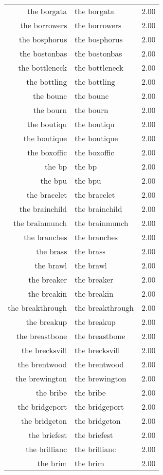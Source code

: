 \begin{table}[ht]
\begin{tabular}{rlr}
  the borgata & the borgata & 2.00 \\ 
  the borrowers & the borrowers & 2.00 \\ 
  the bosphorus & the bosphorus & 2.00 \\ 
  the bostonbas & the bostonbas & 2.00 \\ 
  the bottleneck & the bottleneck & 2.00 \\ 
  the bottling & the bottling & 2.00 \\ 
  the bounc & the bounc & 2.00 \\ 
  the bourn & the bourn & 2.00 \\ 
  the boutiqu & the boutiqu & 2.00 \\ 
  the boutique & the boutique & 2.00 \\ 
  the boxoffic & the boxoffic & 2.00 \\ 
  the bp & the bp & 2.00 \\ 
  the bpu & the bpu & 2.00 \\ 
  the bracelet & the bracelet & 2.00 \\ 
  the brainchild & the brainchild & 2.00 \\ 
  the brainmunch & the brainmunch & 2.00 \\ 
  the branches & the branches & 2.00 \\ 
  the brass & the brass & 2.00 \\ 
  the brawl & the brawl & 2.00 \\ 
  the breaker & the breaker & 2.00 \\ 
  the breakin & the breakin & 2.00 \\ 
  the breakthrough & the breakthrough & 2.00 \\ 
  the breakup & the breakup & 2.00 \\ 
  the breastbone & the breastbone & 2.00 \\ 
  the brecksvill & the brecksvill & 2.00 \\ 
  the brentwood & the brentwood & 2.00 \\ 
  the brewington & the brewington & 2.00 \\ 
  the bribe & the bribe & 2.00 \\ 
  the bridgeport & the bridgeport & 2.00 \\ 
  the bridgeton & the bridgeton & 2.00 \\ 
  the briefest & the briefest & 2.00 \\ 
  the brillianc & the brillianc & 2.00 \\ 
  the brim & the brim & 2.00 \\ 

\end{tabular}
\end{table}
